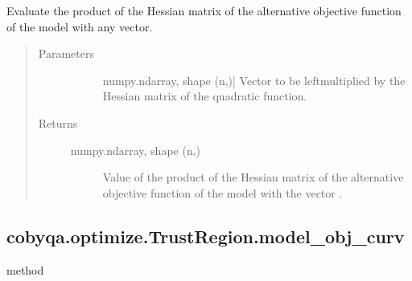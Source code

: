 \documentclass[letterpaper,10pt,english]{sphinxmanual}
\begin{document}
\begin{fulllineitems}
\begin{fulllineitems}
\label{\detokenize{refs/generated/cobyqa.optimize.TrustRegion.model_obj_alt_hessp:cobyqa.optimize.TrustRegion.model_obj_alt_hessp}}
\sphinxAtStartPar
Evaluate the product of the Hessian matrix of the alternative objective
function of the model with any vector.
\begin{quote}\begin{description}
\item[{Parameters}] \leavevmode\begin{description}
\item[{}] \leavevmode{[}numpy.ndarray, shape (n,){]}
\sphinxAtStartPar
Vector to be left\sphinxhyphen{}multiplied by the Hessian matrix of the quadratic
function.

\end{description}

\item[{Returns}] \leavevmode\begin{description}
\item[{numpy.ndarray, shape (n,)}] \leavevmode
\sphinxAtStartPar
Value of the product of the Hessian matrix of the alternative
objective function of the model with the vector .

\end{description}

\end{description}\end{quote}

\end{fulllineitems}



\subsection{cobyqa.optimize.TrustRegion.model\_obj\_curv}
\label{\detokenize{refs/generated/cobyqa.optimize.TrustRegion.model_obj_curv:cobyqa-optimize-trustregion-model-obj-curv}}\label{\detokenize{refs/generated/cobyqa.optimize.TrustRegion.model_obj_curv::doc}}
\sphinxAtStartPar
method


\end{fulllineitems}
\end{document}
